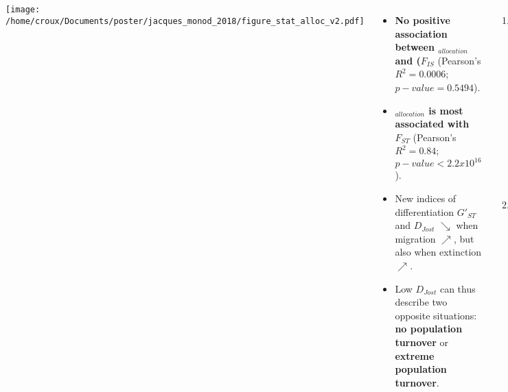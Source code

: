 \documentclass[25pt, a0paper, portrait, margin=0mm, innermargin=15mm,
     blockverticalspace=15mm, colspace=15mm, subcolspace=8mm]{tikzposter}
\begin{document}
\begin{columns}
{
\begin{center}
   \texttt{[image: /home/croux/Documents/poster/jacques\_monod\_2018/figure\_stat\_alloc\_v2.pdf]}
\end{center}

\begin{itemize}
  \item \textbf{No positive association between {\faVenus$_{allocation}$} and ($F_{IS}$} (Pearson's $R^{2}=0.0006$; $p-value=0.5494$).
  \item \textbf{{\faVenus$_{allocation}$} is most associated with $F_{ST}$} (Pearson's $R^{2}=0.84$; $p-value<2.2x10^{16}$).
  \item New indices of differentiation $G'_{ST}$ and $D_{Jost}$ $\searrow$ when migration $\nearrow$, but also when extinction $\nearrow$.
  \item Low $D_{Jost}$ can thus describe two opposite situations: \textbf{no population turnover} or \textbf{extreme population turnover}.
\end{itemize}
}


%


{
\begin{enumerate}
\item Population \textbf{turnover should select for {\faVenus}-biased allocation} if migration is insufficiently strong to erase the genetic signatures of inbreeding brought about by colonisation.
\item In metapopulations: \textbf{$F_{ST}$ is a much better predictor of the sex allocation selected than $F_{IS}$}.
\end{enumerate}


}


{
\begin{small}

  \hangindent=2cm Düsing, K (1883) Die Factoren, welche die Sexualität entscheiden (Dissertation vorgelegt).


\end{small}}
\end{columns}
\end{document}
